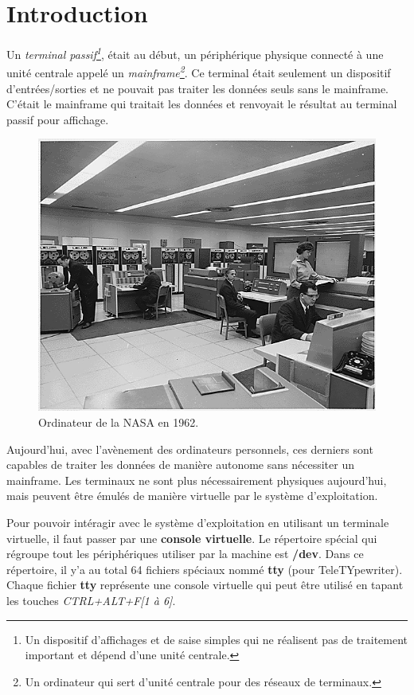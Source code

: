 \section{Introduction}
Un \textit{terminal passif\footnote{Un dispositif d’affichages et de saise simples qui ne réalisent pas de traitement important et dépend d’une unité centrale.}}, était au début, un périphérique physique connecté à une unité centrale appelé un \textit{mainframe\footnote{Un ordinateur qui sert d'unité centrale pour des réseaux de terminaux.}}.
Ce terminal était seulement un dispositif d'entrées/sorties et ne pouvait pas traiter les données seuls sans le mainframe. C'était le mainframe qui traitait les données et renvoyait le résultat au terminal passif pour affichage.

\begin{figure}[h]
    \centering
    \includegraphics[width=0.8\linewidth]{images/mainframe.jpeg}
    \caption{Ordinateur de la NASA en 1962.}
\end{figure}

Aujourd'hui, avec l'avènement des ordinateurs personnels, ces derniers sont capables de traiter les données de manière autonome sans nécessiter un mainframe. Les terminaux ne sont plus nécessairement physiques aujourd'hui, mais peuvent être émulés de manière virtuelle par le système d'exploitation.

Pour pouvoir intéragir avec le système d'exploitation en utilisant un terminale virtuelle, il faut passer par une \textbf{console virtuelle}. Le répertoire spécial qui régroupe tout les périphériques utiliser par la machine est \textbf{/dev}. Dans ce répertoire, il y'a au total 64 fichiers spéciaux nommé \textbf{tty} (pour TeleTYpewriter).
Chaque fichier \textbf{tty} représente une console virtuelle qui peut être utilisé en tapant les touches \textit{CTRL+ALT+F[1 à 6]}.

